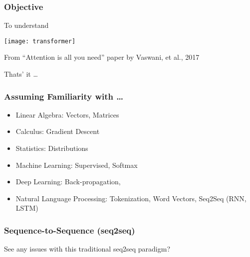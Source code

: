 \begin{frame}[fragile]\frametitle{Objective}

To understand

			\begin{center}
			\texttt{[image: transformer]}
			
			{\tiny From ``Attention is all you need'' paper by Vaswani, et al., 2017}
			\end{center}		

			Thats' it \ldots
			
\end{frame}

\begin{frame}[fragile]\frametitle{Assuming Familiarity with \ldots}

\begin{itemize}
\item Linear Algebra: Vectors, Matrices
\item Calculus: Gradient Descent
\item Statistics: Distributions
\item Machine Learning: Supervised, Softmax
\item Deep Learning: Back-propagation, 
\item Natural Language Processing: Tokenization, Word Vectors, Seq2Seq (RNN, LSTM)
\end{itemize}	

\end{frame}


\begin{frame}[fragile]\frametitle{Sequence-to-Sequence (seq2seq)}

\begin{center}
See any issues with this traditional seq2seq paradigm?
\end{center}	

\end{frame}

